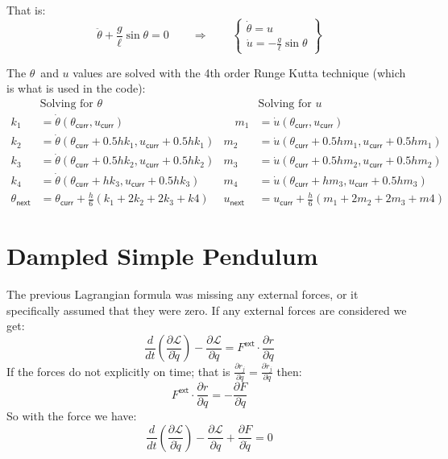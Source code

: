 \documentclass[letterpaper,8pt]{article}
\begin{document}
That is:
\[
\ddot{\theta} + \frac{g}{\ell} \sin \theta = 0 
\qquad\Rightarrow\qquad
\left\{ 
\begin{array}{l}
\dot{\theta} = u \\
\dot{u} = - \frac{g}{\ell} \sin \theta
\end{array}
\right\}
\]

The $\theta$\ and $u$ values are solved with the 4th order Runge Kutta technique (which is what is used in the code):
\begin{align*}
    & \text{Solving for $\theta$}                                                   &           & \text{Solving for $u$} \\
k_1 &= \dot{\theta} (\theta_\mathsf{curr}, u_\mathsf{curr})                         &\quad  m_1 &= \dot{u}(\theta_\mathsf{curr}, u_\mathsf{curr}) \\
k_2 &= \dot{\theta} (\theta_\mathsf{curr} + 0.5 hk_1, u_\mathsf{curr} + 0.5 hk_1)   &       m_2 &= \dot{u}(\theta_\mathsf{curr} + 0.5 hm_1, u_\mathsf{curr} + 0.5 hm_1) \\
k_3 &= \dot{\theta} (\theta_\mathsf{curr} + 0.5 hk_2, u_\mathsf{curr} + 0.5 hk_2)   &       m_3 &= \dot{u}(\theta_\mathsf{curr} + 0.5 hm_2, u_\mathsf{curr} + 0.5 hm_2) \\
k_4 &= \dot{\theta} (\theta_\mathsf{curr} + hk_3, u_\mathsf{curr} + 0.5 hk_3)       &       m_4 &= \dot{u}(\theta_\mathsf{curr} + hm_3, u_\mathsf{curr} + 0.5 hm_3) \\
\theta_\mathsf{next} &= \theta_\mathsf{curr} + \frac{h}{6} (k_1 + 2k_2 + 2k_3 + k4) & u_\mathsf{next} &= u_\mathsf{curr} + \frac{h}{6} (m_1 + 2m_2 + 2m_3 + m4)
\end{align*}


\section{Dampled Simple Pendulum}

The previous Lagrangian formula was missing any external forces, or it specifically assumed that they were zero.  If any
external forces are considered we get:
\[
\frac{d}{dt}\left( \frac{\partial\mathcal{L}}{\partial \dot{q}} \right) -
\frac{\partial \mathcal{L}}{\partial q} = F^\mathsf{ext} \cdot \frac{\partial r}{\partial q}
\]
If the forces do not explicitly on time; that is $\frac{\partial r_j}{\partial q} = \frac{\partial \dot{r}_j }{\partial \dot{q}} $ 
then:
\[
F^\mathsf{ext} \cdot \frac{\partial r}{\partial q} = - \frac{\partial F}{\partial \dot{q}}
\]
So with the force we have:
\[
\frac{d}{dt}\left( \frac{\partial\mathcal{L}}{\partial \dot{q}} \right) -
\frac{\partial \mathcal{L}}{\partial q} + \frac{\partial F}{\partial \dot{q}} = 0
\]
\end{document}
